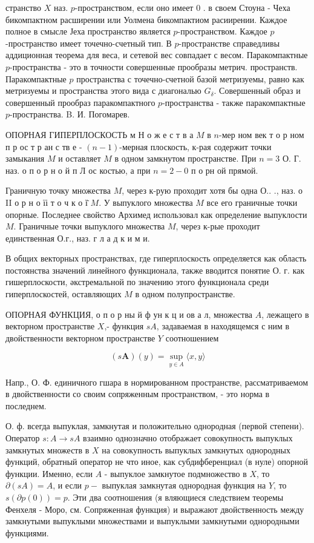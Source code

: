 \documentclass[10pt]{article}
\begin{document}
странство $X$ наз. $p$-пространством, если оно имеет 0 . в своем Стоуна - Чеха бикомпактном расширении или Уолмена бикомпактиом расиирении. Каждое полное в смысле Јеха пространство является $p$-пространством. Каждое $p$-пространство имеет точечно-счетный тип. В $p$-пространстве справедливы аддиционная теорема для веса, и сетевой вес совпадает с весом. Паракомпактные $p$-пространства - это в точности совершенные прообразы метрич. пространств. Паракомпактные $p$ пространства с точечно-счетной базой метризуемы, равно как метризуемы и пространства этого вида с диагональю $G_{\delta}$. Совершенный образ и совершенный прообраз паракомпактного $p$-пространства - также паракомпактные $p$-пространства. B. И. Погомарев.

ОПОРНАЯ ГИПЕРПЛОСКОСТЬ м Н о ж е с т в а $M$ в $n$-мер ном век т о р ном п р ос т р ан с тв е - $(n-1)$-мерная плоскость, к-рая содержит точки замыкания $M$ и оставляет $M$ в одном замкнутом пространстве. При $n=3$ О. Г. наз. о п о р н о й п Л ос костью, а при $n=2-0$ п о рн ой прямой.

Граничную точку множества $M$, через к-рую проходит хотя бы одна О.. ., наз. о II о р н о їі т о ч к о ї̈ $M$. У выпуклого множества $M$ все его граничные точки опорные. Последнее свойство Архимед использовал как определение выпуклости $M$. Граничные точки выпуклого множества $M$, через к-рые проходит единственная О.г., наз. г л а д к и м и.

В общих векторных пространствах, где гиперплоскость определяется как область постоянства значений линейного функционала, также вводится понятие О. г. как гишерплоскости, әкстремальной по значению этого функционала среди гиперплоскостей, оставляющих $M$ в одном полупространстве.

ОПОРНАЯ ФУНКЦИЯ, о п о р ны й ф ун к ц и ов а л, множества $A$, лежащего в векторном пространстве $X$,- функция $s A$, задаваемая в находящемся с ним в двойственности векторном пространстве $Y$ соотношением

\[
(s \boldsymbol{A})(y)=\sup _{y \in A}\langle x, y\rangle
\]

Напр., О. Ф. единичного гшара в нормированном пространстве, рассматриваемом в двойственности со своим сопряженным пространством, - это норма в последнем.

О. ф. всегда выпуклая, замкнутая и положительно однородная (первой степени). Оператор $s: A \rightarrow s A$ взаимно однозначно отображает совокупность выпуклых замкнутых множеств в $X$ на совокупность выпуклых замкнутых однородных функций, обратный оператор не что иное, как субдифберенциал (в нуле) опорной функции. Именно, если $A$ - выпуклое замкнутое подмножество в $X$, то $\partial(s A)=A$, и если $p-$ выпуклая замкнутая однородная функция на $Y$, то $s(\partial p(0))=p$. Эти два соотношения (я вляющиеся следствием теоремы Фенхеля - Моро, см. Сопряженная функция) и выражают двойственность между замкнутыми выпуклыми множествами и выпуклыми замкнутыми однородными функциями.
\end{document}

